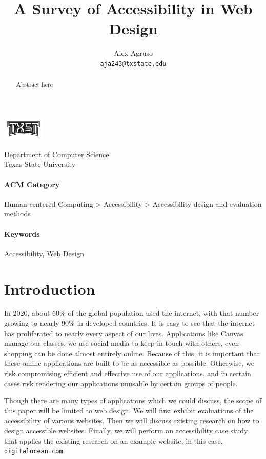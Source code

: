 \documentclass{article}
\title{A Survey of Accessibility in Web Design}
\author{%
  Alex Agruso\\
  \texttt{aja243@txstate.edu} \\
}
\begin{document}
\noindent\begin{minipage}{0.15\textwidth}%
	\includegraphics[width=2.0cm]{images/txst-black.jpg}
\end{minipage}%
\hfill%
\begin{minipage}{1\textwidth}\raggedright
	Department of Computer Science\\
	Texas State University\\
\end{minipage}


\maketitle


\begin{abstract}
	Abstract here
\end{abstract}


\paragraph{ACM Category} Human-centered Computing > Accessibility > Accessibility design and evaluation methods
\paragraph{Keywords} Accessibility, Web Design


\section{Introduction}
In 2020, about 60\% of the global population used the internet, with that number growing to nearly 90\% in developed countries.
\cite{WorldInternetUsage}
It is easy to see that the internet has proliferated to nearly every aspect of our lives.
Applications like Canvas manage our classes, we use social media to keep in touch with others, even shopping can be done almost entirely online.
Because of this, it is important that these online applications are built to be as accessible as possible.
Otherwise, we risk compromising efficient and effective use of our applications, and in certain cases risk rendering our applications unusable by certain groups of people.

Though there are many types of applications which we could discuss, the scope of this paper will be limited to web design.
We will first exhibit evaluations of the accessibility of various websites.
Then we will discuss existing research on how to design accessible websites.
Finally, we will perform an accessibility case study that applies the existing research on an example website, in this case, \verb|digitalocean.com|.
\end{document}
